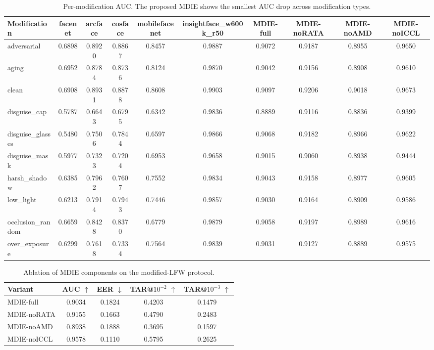 \begin{table}[t]
\centering
\caption{Per-modification AUC. The proposed MDIE shows the smallest AUC drop across modification types.}
\label{tab:permod}
\begin{tabular}{lccccccccc}
\hline
Modification & facenet & arcface & cosface & mobilefacenet & insightface_w600k_r50 & MDIE-full & MDIE-noRATA & MDIE-noAMD & MDIE-noICCL \\
\hline
adversarial & 0.6898 & 0.8920 & 0.8867 & 0.8457 & 0.9887 & 0.9072 & 0.9187 & 0.8955 & 0.9650 \\
aging & 0.6952 & 0.8784 & 0.8736 & 0.8124 & 0.9870 & 0.9042 & 0.9156 & 0.8908 & 0.9610 \\
clean & 0.6908 & 0.8931 & 0.8878 & 0.8608 & 0.9903 & 0.9097 & 0.9206 & 0.9018 & 0.9673 \\
disguise_cap & 0.5787 & 0.6643 & 0.6795 & 0.6342 & 0.9836 & 0.8889 & 0.9116 & 0.8836 & 0.9399 \\
disguise_glasses & 0.5480 & 0.7506 & 0.7844 & 0.6597 & 0.9866 & 0.9068 & 0.9182 & 0.8966 & 0.9622 \\
disguise_mask & 0.5977 & 0.7323 & 0.7204 & 0.6953 & 0.9658 & 0.9015 & 0.9060 & 0.8938 & 0.9444 \\
harsh_shadow & 0.6385 & 0.7962 & 0.7607 & 0.7552 & 0.9834 & 0.9043 & 0.9158 & 0.8977 & 0.9605 \\
low_light & 0.6213 & 0.7914 & 0.7943 & 0.7446 & 0.9857 & 0.9030 & 0.9164 & 0.8909 & 0.9586 \\
occlusion_random & 0.6659 & 0.8428 & 0.8370 & 0.6779 & 0.9879 & 0.9058 & 0.9197 & 0.8989 & 0.9616 \\
over_exposure & 0.6299 & 0.7618 & 0.7334 & 0.7564 & 0.9839 & 0.9031 & 0.9127 & 0.8889 & 0.9575 \\
\hline
\end{tabular}
\end{table}

\begin{table}[t]
\centering
\caption{Ablation of MDIE components on the modified-LFW protocol.}
\label{tab:ablation}
\begin{tabular}{lcccc}
\hline
Variant & AUC $\uparrow$ & EER $\downarrow$ & TAR@$10^{-2}$ $\uparrow$ & TAR@$10^{-3}$ $\uparrow$ \\
\hline
MDIE-full & 0.9034 & 0.1824 & 0.4203 & 0.1479 \\
MDIE-noRATA & 0.9155 & 0.1663 & 0.4790 & 0.2483 \\
MDIE-noAMD & 0.8938 & 0.1888 & 0.3695 & 0.1597 \\
MDIE-noICCL & 0.9578 & 0.1110 & 0.5795 & 0.2625 \\
\hline
\end{tabular}
\end{table}
